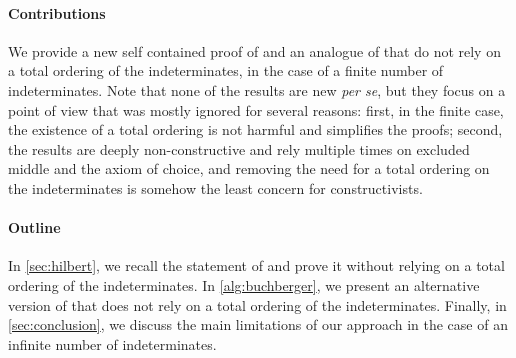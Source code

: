 \paragraph{Contributions} \AP We provide a new self contained proof of
 and an analogue of 
that do not rely on a total ordering of the indeterminates, in the case of a
finite number of indeterminates. Note that none of the results are new
\emph{per se}, but they focus on a point of view that was mostly ignored for
several reasons: first, in the finite case, the existence of a total ordering
is not harmful and simplifies the proofs; second, the results are deeply
non-constructive and rely multiple times on excluded middle and the axiom of
choice, and removing the need for a total ordering on the indeterminates is
somehow the least concern for constructivists.

\paragraph{Outline} \AP In
\cref{sec:hilbert}, we recall the
statement of  and prove it without relying on a
total ordering of the indeterminates. In
\cref{alg:buchberger},
we present an alternative version of  that does not
rely on a total ordering of the indeterminates. Finally, in
\cref{sec:conclusion}, we discuss the main
limitations of our approach in the case of an infinite number of
indeterminates.


